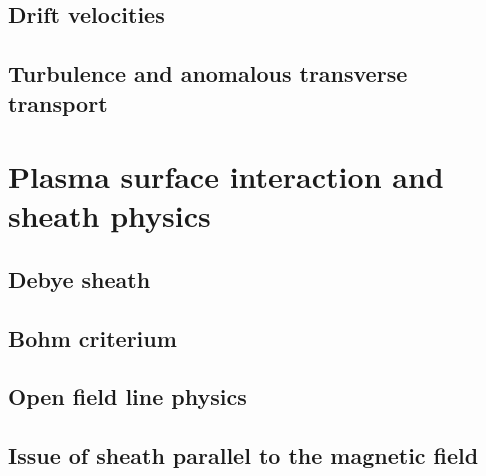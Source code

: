 		\subsection{Drift velocities}
		\subsection{Turbulence and anomalous transverse transport}
	\section{Plasma surface interaction and sheath physics}
		\subsection{Debye sheath}
		\subsection{Bohm criterium}
		\subsection{Open field line physics}
		\subsection{Issue of sheath parallel to the magnetic field}

		